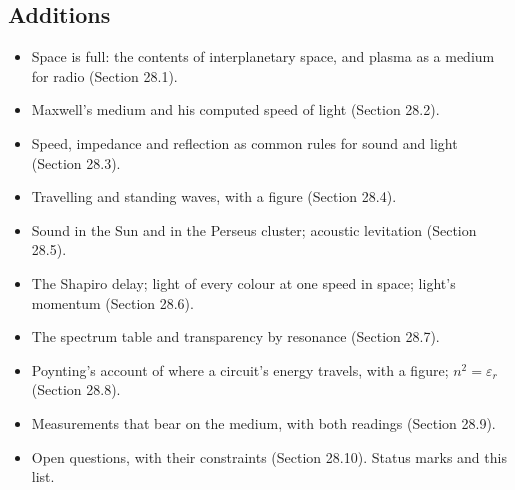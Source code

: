 \documentclass[11pt,a4paper]{article}
\begin{document}
\subsection*{Additions}
\begin{itemize}
\item Space is full: the contents of interplanetary space, and plasma as a medium for radio (Section 28.1).
\item Maxwell's medium and his computed speed of light (Section 28.2).
\item Speed, impedance and reflection as common rules for sound and light (Section 28.3).
\item Travelling and standing waves, with a figure (Section 28.4).
\item Sound in the Sun and in the Perseus cluster; acoustic levitation (Section 28.5).
\item The Shapiro delay; light of every colour at one speed in space; light's momentum (Section 28.6).
\item The spectrum table and transparency by resonance (Section 28.7).
\item Poynting's account of where a circuit's energy travels, with a figure; $n^2 = \varepsilon_r$ (Section 28.8).
\item Measurements that bear on the medium, with both readings (Section 28.9).
\item Open questions, with their constraints (Section 28.10). Status marks and this list.
\end{itemize}

\normalsize
\nocite{rashadaPart15}

\end{document}
